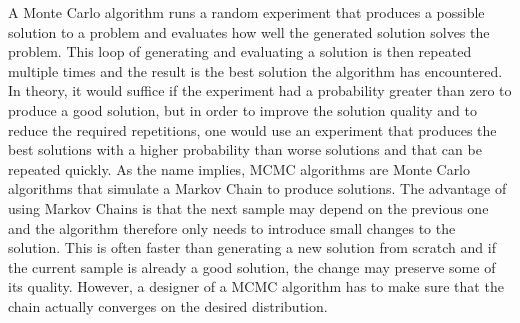 
A Monte Carlo algorithm runs a random experiment that produces a possible solution to a problem and evaluates how well the generated solution solves the problem. This loop of generating and evaluating a solution is then repeated multiple times and the result is the best solution the algorithm has encountered. In theory, it would suffice if the experiment had a probability greater than zero to produce a good solution, but in order to improve the solution quality and to reduce the required repetitions, one would use an experiment that produces the best solutions with a higher probability than worse solutions and that can be repeated quickly. As the name implies, \ac{MCMC} algorithms are Monte Carlo algorithms that simulate a Markov Chain to produce solutions. The advantage of using Markov Chains is that the next sample may depend on the previous one and the algorithm therefore only needs to introduce small changes to the solution. This is often faster than generating a new solution from scratch and if the current sample is already a good solution, the change may preserve some of its quality. However, a designer of a \ac{MCMC} algorithm has to make sure that the chain actually converges on the desired distribution.